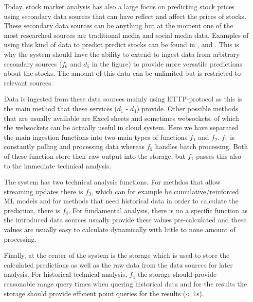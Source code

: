 \documentclass[article,11pt]{article}
\begin{document}
Today, stock market analysis has also a large focus on predicting stock prices using secondary data sources that can have reflect and affect the prices of stocks. 
These secondary data sources can be anything but at the moment one of the most researched sources are traditional media and social media data.
Examples of using this kind of data to predict predict stocks can be found in \cite{kao}, \cite{skuza} and \cite{wai}.
This is why the system should have the ability to extend to ingest data from arbitrary secondary sources ($f_6$ and $d_5$ in the figure) to provide more versatile predictions about the stocks.
The amount of this data can be unlimited but is restricted to relevant sources.

Data is ingested from these data sources mainly using HTTP-protocol as this is the main method that these services ($d_1$ - $d_4$) provide.
Other possible methods that are usually available are Excel sheets and sometimes websockets, of which the websockets can be actually useful in cloud system.
Here we have separated the main ingestion functions into two main types of functions $f_1$ and $f_2$. 
$f_1$ is constantly polling and processing data whereas $f_2$ handles batch processing.
Both of these function store their raw output into the storage, but $f_1$ passes this also to the immediate technical analysis.

The system has two technical analysis functions.
For methdos that allow streaming updates there is $f_3$, which can for example be cumulative/reinforced ML models and for methods that need historical data in order to calculate the prediction, there is $f_4$.
For fundamental analysis, there is no a specific function as the introduced data sources usually provide these values pre-calculated and these values are usually easy to calculate dynamically with little to none amount of processing.

Finally, at the center of the system is the storage which is used to store the calculated predictions as well as the raw data from the data sources for later analysis.
For historical technical analysis, $f_4$ the storage should provide reasonable range query times when quering historical data and for the results the storage should provide efficient point queries for the results (< 1s).

\end{document}
